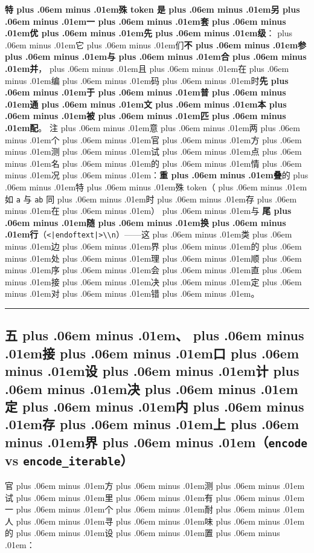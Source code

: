 \documentclass[
]{article}
\newcommand{\passthrough}[1]{#1}
\providecommand{\texorpdfstring}[2]{#1}   %
\def\zh#1{{\zhfont #1}}
\def\zhglue{\hskip0pt plus .06em minus .01em}
\begin{document}
\textbf{\zh{特\zhglue 殊} token \zh{是\zhglue 另\zhglue 一\zhglue 套\zhglue 优\zhglue 先\zhglue 级}}\zh{：\zhglue 它\zhglue 们}\textbf{\zh{不\zhglue 参\zhglue 与\zhglue 合\zhglue 并}}\zh{，\zhglue 且\zhglue 在\zhglue 编\zhglue 码\zhglue 时}\textbf{\zh{先\zhglue 于\zhglue 普\zhglue 通\zhglue 文\zhglue 本\zhglue 被\zhglue 匹\zhglue 配}}\zh{。} \zh{注\zhglue 意\zhglue 两\zhglue 个\zhglue 官\zhglue 方\zhglue 测\zhglue 试\zhglue 点\zhglue 名\zhglue 的\zhglue 情\zhglue 况\zhglue ：}\textbf{\zh{重\zhglue 叠}}\zh{的\zhglue 特\zhglue 殊} token\zh{（\zhglue 如} \passthrough{\lstinline!a!} \zh{与} \passthrough{\lstinline!ab!} \zh{同\zhglue 时\zhglue 存\zhglue 在\zhglue ）\zhglue 与} \textbf{\zh{尾\zhglue 随\zhglue 换\zhglue 行}}\zh{（}\passthrough{\lstinline!<|endoftext|>\\n!}\zh{）}------\zh{这\zhglue 类\zhglue 边\zhglue 界\zhglue 的\zhglue 处\zhglue 理\zhglue 顺\zhglue 序\zhglue 会\zhglue 直\zhglue 接\zhglue 决\zhglue 定\zhglue 对\zhglue 错\zhglue 。}

\begin{center}\rule{0.5\linewidth}{0.5pt}\end{center}

\subsection{\texorpdfstring{\zh{五\zhglue 、\zhglue 接\zhglue 口\zhglue 设\zhglue 计\zhglue 决\zhglue 定\zhglue 内\zhglue 存\zhglue 上\zhglue 界\zhglue （}\texttt{encode} vs \texttt{encode\_iterable}\zh{）}}{\zh{五\zhglue 、\zhglue 接\zhglue 口\zhglue 设\zhglue 计\zhglue 决\zhglue 定\zhglue 内\zhglue 存\zhglue 上\zhglue 界\zhglue （}encode vs encode\_iterable\zh{）}}}\label{ux4e94ux63a5ux53e3ux8bbeux8ba1ux51b3ux5b9aux5185ux5b58ux4e0aux754cencode-vs-encode_iterable}

\zh{官\zhglue 方\zhglue 测\zhglue 试\zhglue 里\zhglue 有\zhglue 一\zhglue 个\zhglue 耐\zhglue 人\zhglue 寻\zhglue 味\zhglue 的\zhglue 设\zhglue 置\zhglue ：}
\end{document}
